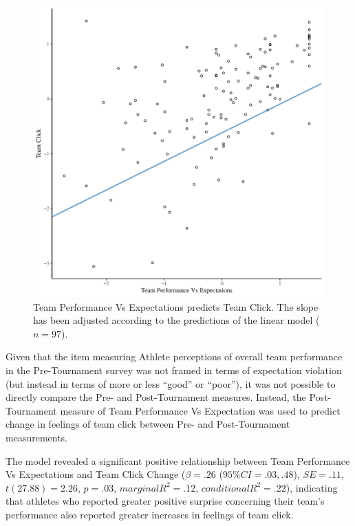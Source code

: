 \begin{CJK}{UTF8}{gbsn}
  \begin{figure}[htbp]
    \centering
  \includegraphics[scale=.5]{images/teamPerfClickModelSlope.pdf}
    \caption{Team Performance Vs Expectations predicts Team Click. The slope has been adjusted according to the predictions of the linear model ($n = 97$).}
    \label{fig:teamPerfClickModelSlope}
  \end{figure}



Given that the item measuring Athlete perceptions of overall team performance in the Pre-Tournament survey was not framed in terms of expectation violation (but instead in terms of more or less ``good'' or ``poor''), it was not possible to directly compare the Pre- and Post-Tournament measures.  Instead, the Post-Tournament measure of Team Performance Vs Expectation was used to predict change in feelings of team click between Pre- and Post-Tournament measurements.

The model revealed a significant positive relationship between Team Performance Vs Expectations and Team Click Change ($\beta = .26$ ($95\% CI =  .03, .48$), $SE = .11$, $t(27.88) = 2.26$, $p = .03$, $marginal R^2 = .12$, $conditional R^2 = .22$), indicating that athletes who reported greater positive surprise concerning their team's performance also reported greater increases in feelings of team click.


\end{CJK}
